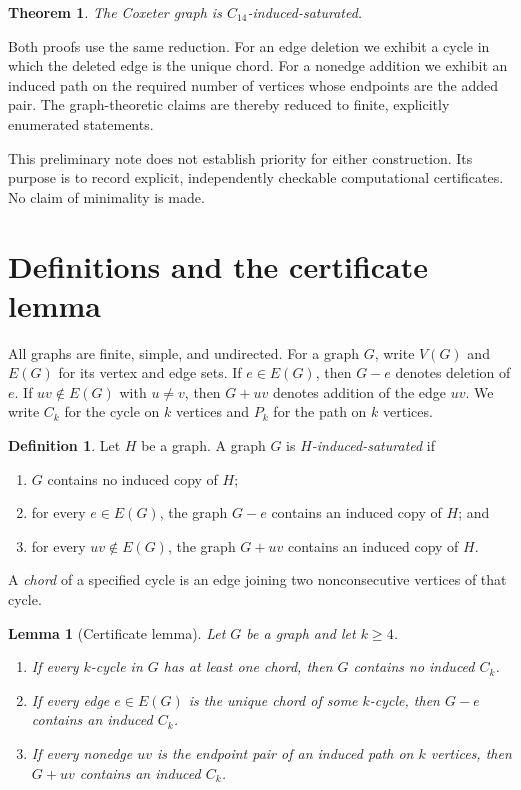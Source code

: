 \documentclass[11pt]{amsart}
\newcommand{\Ck}[1]{C_{#1}}
\newcommand{\Pk}[1]{P_{#1}}
\newtheorem{lemma}[lemma]{Lemma}
\newtheorem{maintheorem}{Theorem}
\theoremstyle{definition}
\newtheorem{definition}[definition]{Definition}
\theoremstyle{remark}
\begin{document}
\begin{maintheorem}\label{thm:c14}
The Coxeter graph is \(\Ck{14}\)-induced-saturated.
\end{maintheorem}

Both proofs use the same reduction.  For an edge deletion we exhibit a cycle
in which the deleted edge is the unique chord.  For a nonedge addition we
exhibit an induced path on the required number of vertices whose endpoints
are the added pair.  The graph-theoretic claims are thereby reduced to
finite, explicitly enumerated statements.

This preliminary note does not establish priority for either construction.
Its purpose is to record explicit, independently checkable computational
certificates.  No claim of minimality is made.

\section{Definitions and the certificate lemma}\label{sec:certificate}

All graphs are finite, simple, and undirected.  For a graph \(G\), write
\(V(G)\) and \(E(G)\) for its vertex and edge sets.  If \(e\in E(G)\), then
\(G-e\) denotes deletion of \(e\).  If \(uv\notin E(G)\) with \(u\ne v\),
then \(G+uv\) denotes addition of the edge \(uv\).  We write \(\Ck{k}\) for
the cycle on \(k\) vertices and \(\Pk{k}\) for the path on \(k\) vertices.

\begin{definition}
Let \(H\) be a graph.  A graph \(G\) is \emph{\(H\)-induced-saturated} if
\begin{enumerate}[label=\textup{(\roman*)}]
  \item \(G\) contains no induced copy of \(H\);
  \item for every \(e\in E(G)\), the graph \(G-e\) contains an induced copy
        of \(H\); and
  \item for every \(uv\notin E(G)\), the graph \(G+uv\) contains an induced
        copy of \(H\).
\end{enumerate}
\end{definition}

A \emph{chord} of a specified cycle is an edge joining two nonconsecutive
vertices of that cycle.

\begin{lemma}[Certificate lemma]\label{lem:certificate}
Let \(G\) be a graph and let \(k\geq 4\).
\begin{enumerate}[label=\textup{(\alph*)}]
  \item If every \(k\)-cycle in \(G\) has at least one chord, then \(G\)
        contains no induced \(\Ck{k}\).
  \item If every edge \(e\in E(G)\) is the unique chord of some
        \(k\)-cycle, then \(G-e\) contains an induced \(\Ck{k}\).
  \item If every nonedge \(uv\) is the endpoint pair of an induced path on
        \(k\) vertices, then \(G+uv\) contains an induced \(\Ck{k}\).
\end{enumerate}
\end{lemma}
\end{document}
